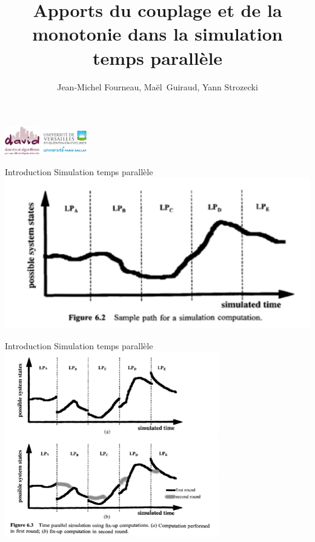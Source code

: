 \documentclass[10pt,usenames,dvipsnames]{beamer}
\title{Apports du couplage et de la monotonie dans la simulation temps parallèle}
\author{Jean-Michel Fourneau, Maël~Guiraud, Yann Strozecki}
\institute[DAVID-UVSQ] 
{
  DAVID, Universit\'e de Versailles Saint Quentin
}
\begin{document}
\begin{frame}

  \titlepage
  \centering
  \includegraphics [width=15mm]{logod.png} \hspace{1cm}\includegraphics [width=20mm]{logo.png} \\
\end{frame}


\begin{frame}{Introduction Simulation temps parallèle}
  \centering
   \includegraphics [width=\textwidth]{tmps.png} 
   
    \cite{fujimoto2000parallel}

\end{frame}




\begin{frame}{Introduction Simulation temps parallèle}
  \centering
   \includegraphics [width=0.7\textwidth]{fuji.png} 
   
\end{frame}
\end{document}
